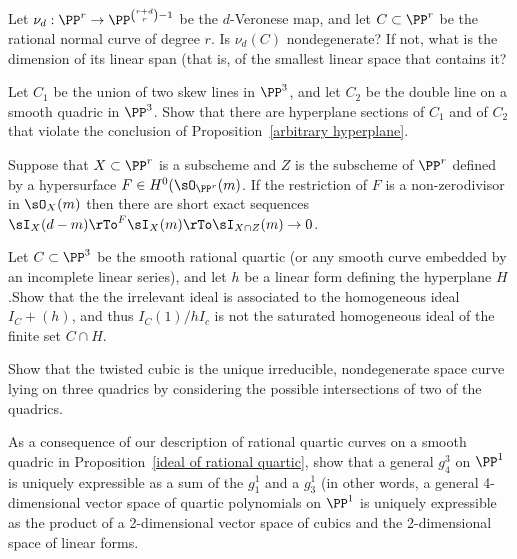 \begin{exercise}
 Let $\nu_d: \PP^r \to \PP^{\binom{r+d}{r}-1}$ be the $d$-Veronese map, and let $C\subset \PP^r$ be the rational normal curve of degree $r$. Is $\nu_d(C)$ nondegenerate? If not, what is the dimension of its linear span (that is, of the smallest linear
 space that contains it?
\end{exercise}

\begin{exercise}\label{arbitrary hyperplane examples}
Let $C_1$ be the union of two skew lines in $\PP^3$, and let $C_2$ be the double line on a smooth quadric in $\PP^3$.
Show that there are hyperplane sections of $C_1$ and of $C_2$ that violate the conclusion of Proposition~\ref{arbitrary hyperplane}.
\end{exercise}

\begin{exercise}\label{restriction of ideals}
Suppose that $X\subset \PP^r$ is a subscheme and  $Z$ is the subscheme of $\PP^r$ defined by a hypersurface $F\in H^0(\sO_{\PP^r}(m)$. If the restriction of $F$ is a non-zerodivisor in $\sO_X(m)$  then there are short exact sequences
$\sI_X(d-m) \rTo^F \sI_X(m) \rTo \sI_{X\cap Z}(m) \to 0$.
\end{exercise}

\begin{exercise}\label{bad restriction}
Let $C\subset \PP^3$ be the smooth rational quartic (or any smooth curve embedded by an incomplete linear series), and let $h$ be a linear form defining the hyperplane $H$.Show that
the the irrelevant ideal is associated to the 
homogeneous ideal $I_C+(h)$, and thus $I_C(1)/hI_c$ is not the saturated homogeneous ideal of the finite
set $C\cap H$. 
\end{exercise}

\begin{exercise}
Show that the twisted cubic is the unique irreducible, nondegenerate space curve lying on three quadrics by considering the possible
intersections of two of the quadrics.
\end{exercise}

\begin{exercise}\label{decomposition of a $g^3_4$}
As a consequence of our description of rational quartic curves on a smooth quadric in Proposition~\ref{ideal of rational quartic},
show that a general $g^3_4$ on $\PP^1$ is uniquely expressible as a sum of the $g_1^1$ and a $g^1_3$
(in other words, a general 4-dimensional vector space of quartic polynomials on $\PP^1$ is uniquely expressible as the product of a 2-dimensional vector space of cubics and the 2-dimensional space of linear forms.
\end{exercise}

